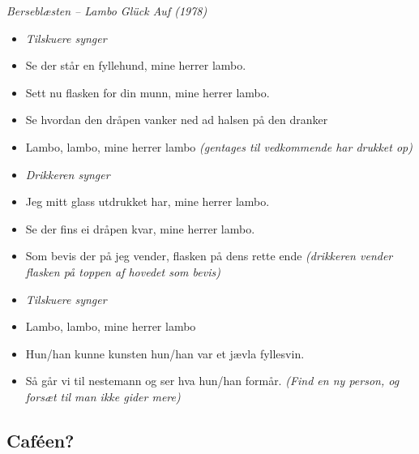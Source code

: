\begin{center}
	\textit{Berseblæsten -- Lambo Glück Auf (1978)}
	\parbox[t]{.5\textwidth}{%
	\begin{itemize}
		\item[] \textit{Tilskuere synger}
		\setlength{\itemsep}{-5pt}
		\item[1.] Se der står en fyllehund, mine herrer lambo.
		\item[] Sett nu flasken for din munn, mine herrer lambo.
		\item[] Se hvordan den dråpen vanker ned ad halsen på den dranker
		\item[] Lambo, lambo, mine herrer lambo \textit{(gentages til vedkommende har drukket op)}
	\end{itemize}
}%
	\parbox[t]{.5\textwidth}{%
		\begin{itemize}
			\setlength{\itemsep}{-5pt}
			\item[] \textit{Drikkeren synger}
			\item[2.] Jeg mitt glass utdrukket har, mine herrer lambo.
			\item[] Se der fins ei dråpen kvar, mine herrer lambo.
			\item[] Som bevis der på jeg vender, flasken på dens rette ende \textit{(drikkeren vender flasken på toppen af hovedet som bevis)}
		\end{itemize}
	}%
\end{center}
\vspace{-20pt}
	\parbox[t]{.5\textwidth}{%
	\begin{itemize}
		\item[] \textit{Tilskuere synger}
		\setlength{\itemsep}{-5pt}
		\item[3.] Lambo, lambo, mine herrer lambo
		\item[] Hun/han kunne kunsten hun/han var et jævla fyllesvin.
		\item[] Så går vi til nestemann og ser hva hun/han formår. \textit{(Find en ny person, og forsæt til man ikke gider mere)}
	\end{itemize}
}%

\newpage

\subsection{Caféen?}


